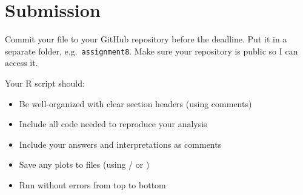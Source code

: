 \section{Submission}

Commit your file to your GitHub repository before the deadline. Put it in a separate folder, e.g.\ \texttt{assignment8}. Make sure your repository is public so I can access it.

Your R script should:
\begin{itemize}
  \item Be well-organized with clear section headers (using comments)
  \item Include all code needed to reproduce your analysis
  \item Include your answers and interpretations as comments
  \item Save any plots to files (using / or )
  \item Run without errors from top to bottom
\end{itemize}


